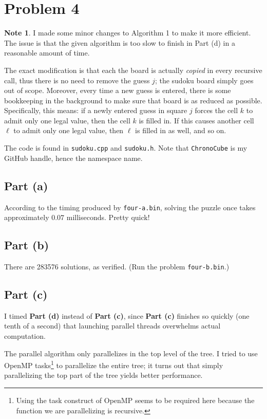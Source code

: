 \documentclass{article}
\theoremstyle{definition}
\newtheorem*{note}{Note}
\begin{document}
\section{Problem 4}
\begin{note}
I made some minor changes to Algorithm 1 to make it more efficient.
The issue is that the given algorithm is too slow to finish
in Part (d) in a reasonable amount of time.

The exact modification is that each the board is actually \emph{copied}
in every recursive call, thus there is no need to remove the guess $j$; the
sudoku board simply goes out of scope. Moreover, every time a new guess is entered,
there is some bookkeeping in the background to make sure that board is
as reduced as possible. Specifically, this means: if a newly entered guess
in square $j$ forces the cell $k$ to admit only one legal value, then the cell $k$
is filled in. If this causes another cell $\ell$ to admit only one legal value,
then $\ell$ is filled in as well, and so on.

The code is found in \texttt{sudoku.cpp} and \texttt{sudoku.h}. Note that
\texttt{ChronoCube} is my GitHub handle, hence the namespace name.

\end{note}

\subsection{Part (a)}
According to the timing produced by \texttt{four-a.bin}, solving the puzzle once
takes approximately $0.07$ milliseconds. Pretty quick!

\subsection{Part (b)}
There are 283576 solutions, as verified.
(Run the problem \texttt{four-b.bin}.)

\subsection{Part (c)}
I timed \textbf{Part (d)} instead of \textbf{Part (c)}, since \textbf{Part (c)} finishes
so quickly (one tenth of a second)
that launching parallel threads overwhelms actual computation.

The parallel algorithm
only parallelizes in the top level of the tree.  I tried to use OpenMP tasks\footnote{Using the task construct of OpenMP seems to be required here because the function we are parallelizing
is recursive.} to parallelize the entire tree; it turns out that simply parallelizing
the top part of the tree yields better performance. 
\end{document}
